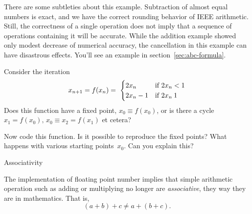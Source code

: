 
There are some subtleties about this example. Subtraction of almost
equal numbers is exact, and we have the correct rounding behavior of
IEEE arithmetic. Still, the correctness of a single operation does not
imply that a sequence of operations containing it will be
accurate. While the addition example showed only modest decrease of
numerical accuracy, the cancellation in this example can have
disastrous effects. You'll see an example in section~\ref{sec:abc-formula}.

\begin{exercise}
  Consider the iteration
  \begin{equation}
    x_{n+1}=f(x_n) = \
  \begin{cases}
    2x_n&\hbox{if $2x_n<1$}\\
    2x_n-1&\hbox{if $2x_n\>1$}\\
  \end{cases}
  \end{equation}
  Does this function have a fixed point, $x_0\equiv f(x_0)$, or is there a cycle
  $x_1=f(x_0),\,x_0\equiv x_2=f(x_1)$ et cetera?

  Now code this function. Is it possible to reproduce the fixed
  points?
  What happens with various starting
  points~$x_0$. Can you explain this?
\end{exercise}

 {Associativity}
\label{sec:fp-associative}

The implementation of floating point number implies
that simple arithmetic operation such as adding or multiplying
no longer are 
\emph{associative},
they way they are in mathematics. That is,
\[ (a+b)+c \not= a+(b+c). \]

